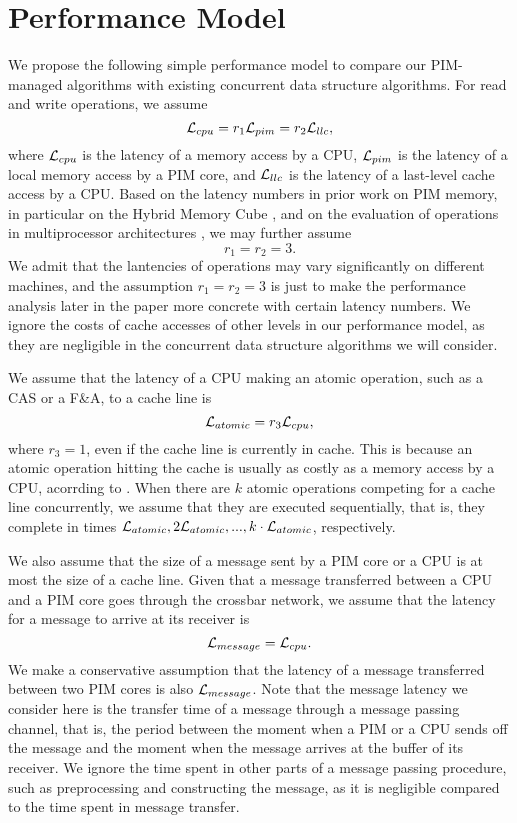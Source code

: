 \section{Performance Model}
\label{section:performance_model}
We propose the following simple performance model to compare 
our PIM-managed algorithms with existing concurrent data structure algorithms.
For read and write operations, we assume 
$$\mathcal{L}_{cpu} = r_1\mathcal{L}_{pim} = r_2\mathcal{L}_{llc},$$
where $\mathcal{L}_{cpu}$ is the latency of a memory access by a CPU,
$\mathcal{L}_{pim}$ is the latency of a local memory access by a PIM core, and
$\mathcal{L}_{llc}$ is the latency of a last-level cache access by a CPU.
Based on the latency numbers in prior work on PIM memory, 
in particular on the Hybrid Memory Cube \cite{website:HMC, Azarkhish16}, 
and on the evaluation of operations in multiprocessor architectures \cite{David13},
we may further assume 
$$r_1 = r_2 = 3.$$ 
We admit that the lantencies of operations may vary significantly on different machines, 
and the assumption $r_1 = r_2 = 3$ is just to make the performance analysis later in the paper 
more concrete with certain latency numbers. 
We ignore the costs of cache accesses of other levels in our performance model,
as they are negligible in the concurrent data structure algorithms we will consider.

We assume that the latency of a CPU making an atomic operation, such as a CAS or a F\&A,
to a cache line is 
$$\mathcal{L}_{atomic} = r_3\mathcal{L}_{cpu},$$ 
where $r_3 = 1$, even if the cache line is currently in cache.
This is because an atomic operation hitting the cache is usually 
as costly as a memory access by a CPU, acorrding to \cite{David13}.
When there are $k$ atomic operations competing for a cache line concurrently,
we assume that they are executed sequentially, that is,
they complete in times $\mathcal{L}_{atomic}, 2\mathcal{L}_{atomic},..., k\cdot\mathcal{L}_{atomic}$, respectively.

We also assume that the size of a message sent by a PIM core or a CPU is at most 
the size of a cache line.
Given that a message transferred between a CPU and a PIM core goes through
the crossbar network, we assume that the latency for a message to arrive at its receiver is 
$$\mathcal{L}_{message} = \mathcal{L}_{cpu}.$$
We make a conservative assumption that the latency of a message transferred 
between two PIM cores is also $\mathcal{L}_{message}$.
Note that the message latency we consider here is the transfer time of a message
through a message passing channel, that is, the period between the moment
when a PIM or a CPU sends off the message and the moment when
the message arrives at the buffer of its receiver.
We ignore the time spent in other parts of a message passing procedure,
such as preprocessing and constructing the message,
as it is negligible compared to the time spent in message transfer.